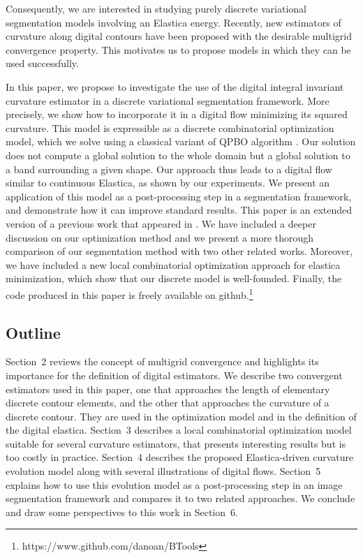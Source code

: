 \documentclass[smallextended]{svjour3}       %
\begin{document}
Consequently, we are interested in studying purely discrete
variational segmentation models involving an Elastica
energy. Recently, new estimators of curvature along digital contours
have been proposed
\cite{roussillon11mdca,coeurjolly13integral,schindele17mdca} with the
desirable multigrid convergence property. This motivates us to propose
models in which they can be used successfully.


In this paper, we propose to investigate the use of the digital
integral invariant curvature estimator \cite{coeurjolly13integral} in
a discrete variational segmentation framework. More precisely, we show
how to incorporate it in a digital flow minimizing its squared
curvature. This model is expressible as a discrete combinatorial
optimization model, which we solve using a classical variant of QPBO
algorithm \cite{rother07qpbo}. Our solution does not compute a global
solution to the whole domain but a global solution to a band
surrounding a given shape. Our approach thus leads to a digital flow
similar to continuous Elastica, as shown by our experiments. We
present an application of this model as a post-processing step in a
segmentation framework, and demonstrate how it can improve standard
results. This paper is an extended version of a previous work that
appeared in \cite{antunes19}. We have included a deeper discussion on
our optimization method and we present a more thorough comparison of
our segmentation method with two other related works. Moreover, we
have included a new local combinatorial optimization approach for
elastica minimization, which show that our discrete model is
well-founded. Finally, the code produced in this paper is freely
available on github.\footnote{https://www.github.com/danoan/BTools}


\subsection{Outline}
Section~2 reviews the concept of multigrid convergence and highlights
its importance for the definition of digital estimators. We describe
two convergent estimators used in this paper, one that approaches the
length of elementary discrete contour elements, and the other that
approaches the curvature of a discrete contour. They are used in the
optimization model and in the definition of the digital
elastica. Section~3 describes a local combinatorial optimization model
suitable for several curvature estimators, that presents interesting
results but is too costly in practice. Section~4 describes the
proposed Elastica-driven curvature evolution model along with several
illustrations of digital flows. Section~5 explains how to use this
evolution model as a post-processing step in an image segmentation
framework and compares it to two related approaches. We conclude and
draw some perspectives to this work in Section~6.
\end{document}
